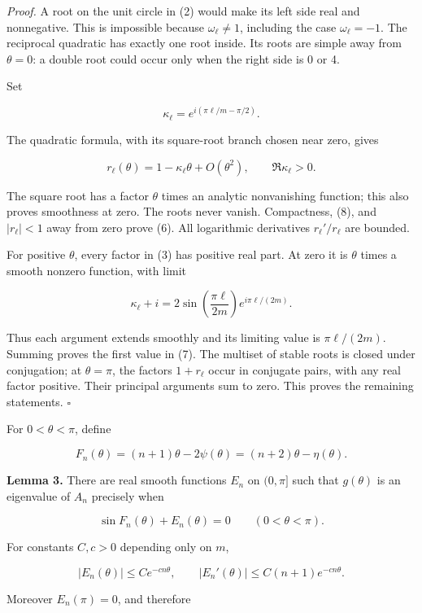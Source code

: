 \documentclass[10pt,a4paper]{article}
\begin{document}
\emph{Proof.} A root on the unit circle in (2) would make its left side real and nonnegative. This is impossible because \(\omega_\ell\ne1\), including the case \(\omega_\ell=-1\). The reciprocal quadratic has exactly one root inside. Its roots are simple away from \(\theta=0\): a double root could occur only when the right side is 0 or 4.

Set

\nopagebreak[3]
\[
\kappa_\ell=e^{i(\pi\ell/m-\pi/2)}.
\]

The quadratic formula, with its square-root branch chosen near zero, gives

\nopagebreak[3]
\[
r_\ell(\theta)=1-\kappa_\ell\theta+O(\theta^2),\qquad
\Re\kappa_\ell>0.
\tag{8}
\]

The square root has a factor \(\theta\) times an analytic nonvanishing function; this also proves smoothness at zero. The roots never vanish. Compactness, (8), and \(|r_\ell|<1\) away from zero prove (6). All logarithmic derivatives \(r_\ell'/r_\ell\) are bounded.

For positive \(\theta\), every factor in (3) has positive real part. At zero it is \(\theta\) times a smooth nonzero function, with limit

\nopagebreak[3]
\[
\kappa_\ell+i
=2\sin\left(\frac{\pi\ell}{2m}\right)e^{i\pi\ell/(2m)}.
\]

Thus each argument extends smoothly and its limiting value is \(\pi\ell/(2m)\). Summing proves the first value in (7). The multiset of stable roots is closed under conjugation; at \(\theta=\pi\), the factors \(1+r_\ell\) occur in conjugate pairs, with any real factor positive. Their principal arguments sum to zero. This proves the remaining statements. \(\square\)

For \(0<\theta<\pi\), define

\nopagebreak[3]
\[
F_n(\theta)=(n+1)\theta-2\psi(\theta)=(n+2)\theta-\eta(\theta).
\tag{9}
\]

\textbf{Lemma 3.} There are real smooth functions \(E_n\) on \((0,\pi]\) such that \(g(\theta)\) is an eigenvalue of \(A_n\) precisely when

\nopagebreak[3]
\[
\sin F_n(\theta)+E_n(\theta)=0\qquad(0<\theta<\pi).
\tag{10}
\]

For constants \(C,c>0\) depending only on \(m\),

\nopagebreak[3]
\[
|E_n(\theta)|\le C e^{-cn\theta},\qquad
|E_n'(\theta)|\le C(n+1)e^{-cn\theta}.
\tag{11}
\]

Moreover \(E_n(\pi)=0\), and therefore
\end{document}
